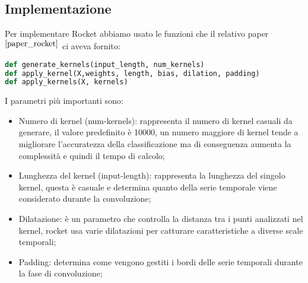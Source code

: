 \subsection{Implementazione}
Per implementare Rocket abbiamo usato le funzioni che il relativo paper$^{\cite{paper_rocket}}$ ci aveva fornito:
\begin{lstlisting}[language=Python]
def generate_kernels(input_length, num_kernels)
def apply_kernel(X,weights, length, bias, dilation, padding)
def apply_kernels(X, kernels)
\end{lstlisting}
I parametri più importanti sono:
\begin{itemize}
    \item Numero di kernel (num-kernels): rappresenta il numero di kernel casuali da generare, il valore predefinito è 10000, un numero maggiore di kernel tende a migliorare l'accuratezza della classificazione ma di conseguenza aumenta la complessità e quindi il tempo di calcolo;
    \item Lunghezza del kernel (input-length): rappresenta la lunghezza del singolo kernel, questa è casuale e determina quanto della serie temporale viene considerato durante la convoluzione;
    \item Dilatazione: è un parametro che controlla la distanza tra i punti analizzati nel kernel, rocket usa varie dilatazioni per catturare caratteristiche a diverse scale temporali;
    \item Padding: determina come vengono gestiti i bordi delle serie temporali durante la fase di convoluzione;
\end{itemize} 

